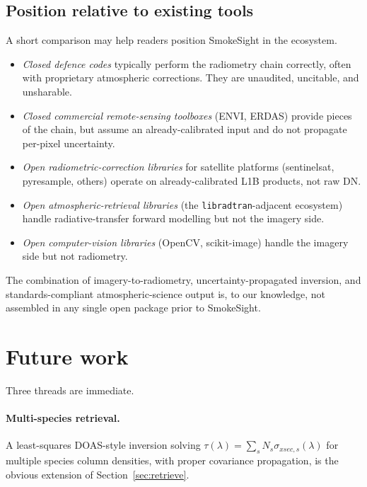 \documentclass[11pt, a4paper]{article}
\begin{document}
\subsection{Position relative to existing tools}

A short comparison may help readers position SmokeSight in the
ecosystem.

\begin{itemize}
  \item \emph{Closed defence codes} typically perform the radiometry
        chain correctly, often with proprietary atmospheric
        corrections. They are unaudited, uncitable, and unsharable.
  \item \emph{Closed commercial remote-sensing toolboxes} (ENVI,
        ERDAS) provide pieces of the chain, but assume an
        already-calibrated input and do not propagate per-pixel
        uncertainty.
  \item \emph{Open radiometric-correction libraries} for satellite
        platforms (sentinelsat, pyresample, others) operate on
        already-calibrated L1B products, not raw DN.
  \item \emph{Open atmospheric-retrieval libraries} (the
        \texttt{libradtran}-adjacent ecosystem) handle
        radiative-transfer forward modelling but not the imagery side.
  \item \emph{Open computer-vision libraries} (OpenCV, scikit-image)
        handle the imagery side but not radiometry.
\end{itemize}

The combination of imagery-to-radiometry, uncertainty-propagated
inversion, and standards-compliant atmospheric-science output is, to
our knowledge, not assembled in any single open package prior to
SmokeSight.

\section{Future work}
\label{sec:future}

Three threads are immediate.

\paragraph{Multi-species retrieval.} A least-squares DOAS-style
inversion \cite{platt2008doas} solving
$\tau(\lambda) = \sum_s N_s \sigma_{xsec, s}(\lambda)$ for multiple
species column densities, with proper covariance propagation, is the
obvious extension of Section~\ref{sec:retrieve}.
\end{document}
